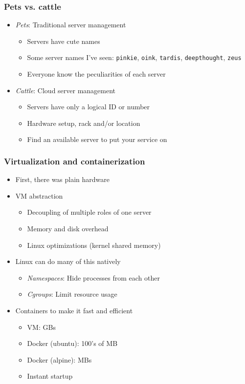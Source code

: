 \documentclass[8pt]{article}
\begin{document}
\subsubsection{Pets vs. cattle}
\label{sec:orgcc1943e}
\begin{itemize}
\item \emph{Pets}: Traditional server management
\begin{itemize}
\item Servers have cute names
\item Some server names I've seen: \texttt{pinkie}, \texttt{oink}, \texttt{tardis}, \texttt{deepthought}, \texttt{zeus}
\item Everyone know the peculiarities of each server
\end{itemize}

\item \emph{Cattle}: Cloud server management
\begin{itemize}
\item Servers have only a logical ID or number
\item Hardware setup, rack and/or location
\item Find an available server to put your service on
\end{itemize}
\end{itemize}
\subsubsection{Virtualization and containerization}
\label{sec:org907c79b}
\begin{itemize}
\item First, there was plain hardware
\item VM abstraction
\begin{itemize}
\item Decoupling of multiple roles of one server
\item Memory and disk overhead
\item Linux optimizations (kernel shared memory)
\end{itemize}
\item Linux can do many of this natively
\begin{itemize}
\item \emph{Namespaces}: Hide processes from each other
\item \emph{Cgroups}: Limit resource usage
\end{itemize}
\item Containers to make it fast and efficient
\begin{itemize}
\item VM: GBs
\item Docker (ubuntu): 100's of MB
\item Docker (alpine): MBs
\item Instant startup
\end{itemize}
\end{itemize}
\end{document}
